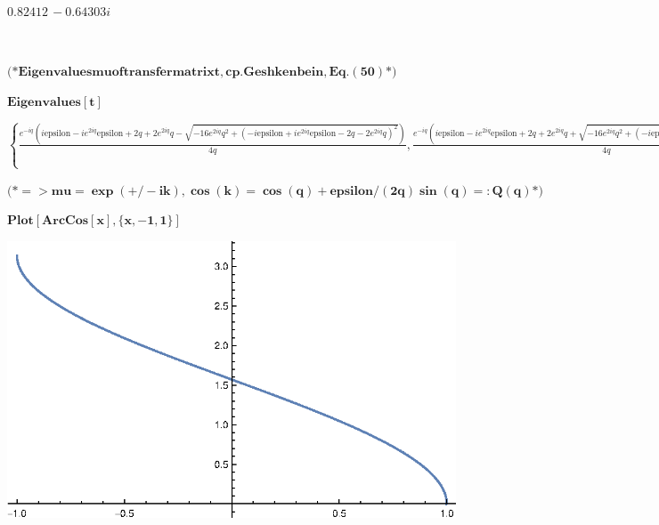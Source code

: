 {\begin{doublespace}
\noindent\(0.82412\, -0.64303 i\)
\end{doublespace}

\begin{doublespace}
\noindent\(\pmb{\text{}}\)
\end{doublespace}

\begin{doublespace}
\noindent\(\pmb{\text{(*} \text{Eigenvalues} \text{mu} \text{of} \text{transfer} \text{matrix} t, \text{cp}. \text{Geshkenbein}, \text{Eq}. (50)
\text{*)}}\)
\end{doublespace}

\begin{doublespace}
\noindent\(\pmb{\text{Eigenvalues}[t]}\)
\end{doublespace}

\begin{doublespace}
\noindent\(\left\{\frac{e^{-i q} \left(i \text{epsilon}-i e^{2 i q} \text{epsilon}+2 q+2 e^{2 i q} q-\sqrt{-16 e^{2 i q} q^2+\left(-i \text{epsilon}+i
e^{2 i q} \text{epsilon}-2 q-2 e^{2 i q} q\right)^2}\right)}{4 q},\frac{e^{-i q} \left(i \text{epsilon}-i e^{2 i q} \text{epsilon}+2 q+2 e^{2 i q}
q+\sqrt{-16 e^{2 i q} q^2+\left(-i \text{epsilon}+i e^{2 i q} \text{epsilon}-2 q-2 e^{2 i q} q\right)^2}\right)}{4 q}\right\}\)
\end{doublespace}

\begin{doublespace}
\noindent\(\pmb{\text{(*} => \text{mu} = \exp (+/- i k), \cos (k) = \cos (q) + \text{epsilon}/(2q) \sin (q) =: Q(q) \text{*)}}\)
\end{doublespace}

\begin{doublespace}
\noindent\(\pmb{\text{Plot}[\text{ArcCos}[x],\{x,-1,1\}]}\)
\end{doublespace}

\includegraphics{chapters/appendices/KP_Mathematica/Kronig_Penney_model_transfer_matrix_gr1.eps}

}
